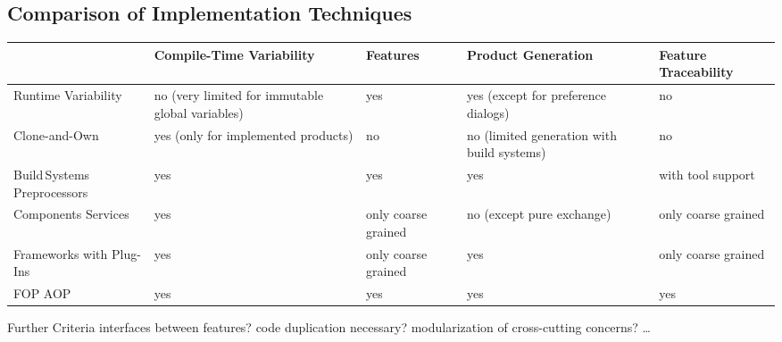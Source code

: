 \subsection{Comparison of Implementation Techniques}
\begin{frame}{\myframetitle}
	\centering
	\begin{tabular}{|p{32mm}|p{32mm}|p{14mm}|p{27mm}|p{14mm}|}
		\hline
		 & Compile-Time Variability & Features & Product \mbox{Generation} & Feature \mbox{Traceability} \\
		\hline\pause
		Runtime \mbox{Variability} & no (very limited for immutable global variables) & yes & yes (except for preference dialogs) & no \\
		\hline\pause
		Clone-and-Own & yes (only for implemented products) & no & no (limited generation with build systems) & no \\
		\hline\pause
		Build\,Systems \linebreak Preprocessors & yes & yes & yes & with tool support \\
		\hline\pause
		Components \linebreak Services & yes & only coarse grained & no (except pure exchange) & only coarse grained \\
		\hline\pause
		Frameworks with Plug-Ins & yes & only coarse grained & yes & only coarse grained \\
		\hline\pause
		FOP \linebreak AOP & yes & yes & yes & yes \\
		\hline
	\end{tabular}
	\pause
	\begin{note}{Further Criteria}
		interfaces between features? code duplication necessary? modularization of cross-cutting concerns? \ldots
	\end{note}
\end{frame}


